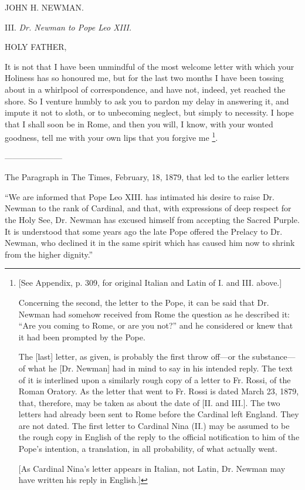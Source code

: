 JOHN H. NEWMAN.

III.
\emph{Dr. Newman to Pope Leo XIII.}

HOLY FATHER,

It is not that I have been unmindful of the most welcome letter with
which your Holiness has so honoured me, but for the last two months I
have been tossing about in a whirlpool of correspondence, and have
not, indeed, yet reached the shore. So I venture humbly to ask you to
pardon my delay in answering it, and impute it not to sloth, or to
unbecoming neglect, but simply to necessity. I hope that I shall soon
be in Rome, and then you will, I know, with your wonted goodness, tell
me with your own lips that you forgive me \footnote{[See Appendix,
p. 309, for original Italian and Latin of I. and III. above.]

Concerning the second, the letter to the Pope, it can be said that
Dr. Newman had somehow received from Rome the question as he described
it: ``Are you coming to Rome, or are you not?'' and he
considered or knew that it had been prompted by the Pope.

The [last] letter, as given, is probably the first throw off—or
the substance—of what he [Dr. Newman] had in mind to say in his
intended reply. The text of it is interlined upon a similarly rough
copy of a letter to Fr. Rossi, of the Roman Oratory. As the letter
that went to Fr. Rossi is dated March 23, 1879, that, therefore, may
be taken as about the date of [II. and III.]. The two letters had
already been sent to Rome before the Cardinal left England. They are
not dated. The first letter to Cardinal Nina (II.) may be assumed to
be the rough copy in English of the reply to the official notification
to him of the Pope's intention, a translation, in all probability, of
what actually went.

[As Cardinal Nina's letter appears in Italian, not Latin, Dr.
Newman may have written his reply in English.]}.

———————

The Paragraph in The Times, February,
18, 1879, that led to the earlier letters

``We are informed that Pope Leo XIII. has intimated his
desire to raise Dr. Newman to the rank of Cardinal, and that, with
expressions of deep respect for the Holy See, Dr. Newman has excused
himself from accepting the Sacred Purple. It is understood that some
years ago the late Pope offered the Prelacy to Dr. Newman, who
declined it in the same spirit which has caused him now to shrink from
the higher dignity.''

